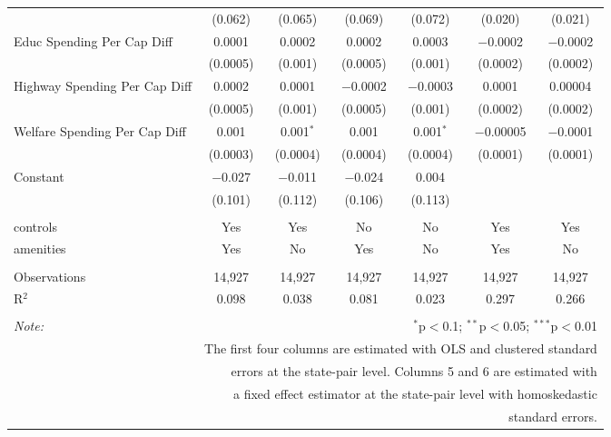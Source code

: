 \begin{table}[!htbp]
\begin{tabular}{@{\extracolsep{5pt}}lcccccc}
  & (0.062) & (0.065) & (0.069) & (0.072) & (0.020) & (0.021) \\ 
  Educ Spending Per Cap Diff & 0.0001 & 0.0002 & 0.0002 & 0.0003 & $-$0.0002 & $-$0.0002 \\ 
  & (0.0005) & (0.001) & (0.0005) & (0.001) & (0.0002) & (0.0002) \\ 
  Highway Spending Per Cap Diff & 0.0002 & 0.0001 & $-$0.0002 & $-$0.0003 & 0.0001 & 0.00004 \\ 
  & (0.0005) & (0.001) & (0.0005) & (0.001) & (0.0002) & (0.0002) \\ 
  Welfare Spending Per Cap Diff & 0.001 & 0.001$^{*}$ & 0.001 & 0.001$^{*}$ & $-$0.00005 & $-$0.0001 \\ 
  & (0.0003) & (0.0004) & (0.0004) & (0.0004) & (0.0001) & (0.0001) \\ 
  Constant & $-$0.027 & $-$0.011 & $-$0.024 & 0.004 &  &  \\ 
  & (0.101) & (0.112) & (0.106) & (0.113) &  &  \\ 
 \hline \\[-1.8ex] 
controls & Yes & Yes & No & No & Yes & Yes \\ 
amenities & Yes & No & Yes & No & Yes & No \\ 
\hline \\[-1.8ex] 
Observations & 14,927 & 14,927 & 14,927 & 14,927 & 14,927 & 14,927 \\ 
R$^{2}$ & 0.098 & 0.038 & 0.081 & 0.023 & 0.297 & 0.266 \\ 
\hline 
\hline \\[-1.8ex] 
\textit{Note:}  & \multicolumn{6}{r}{$^{*}$p$<$0.1; $^{**}$p$<$0.05; $^{***}$p$<$0.01} \\ 
 & \multicolumn{6}{r}{The first four columns are estimated with OLS and clustered standard} \\ 
 & \multicolumn{6}{r}{ errors at the state-pair level. Columns 5 and 6 are estimated with} \\ 
 & \multicolumn{6}{r}{a fixed effect estimator at the state-pair level with homoskedastic} \\ 
 & \multicolumn{6}{r}{standard errors.} \\ 
\end{tabular} 
\end{table} 
